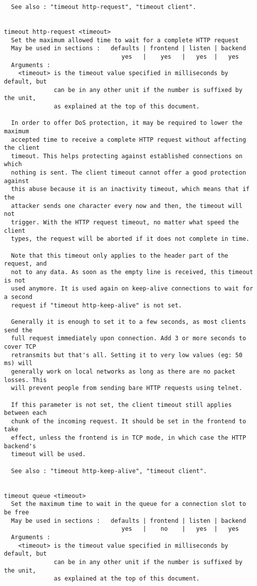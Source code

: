 \begin{verbatim}
  See also : "timeout http-request", "timeout client".


timeout http-request <timeout>
  Set the maximum allowed time to wait for a complete HTTP request
  May be used in sections :   defaults | frontend | listen | backend
                                 yes   |    yes   |   yes  |   yes
  Arguments :
    <timeout> is the timeout value specified in milliseconds by default, but
              can be in any other unit if the number is suffixed by the unit,
              as explained at the top of this document.

  In order to offer DoS protection, it may be required to lower the maximum
  accepted time to receive a complete HTTP request without affecting the client
  timeout. This helps protecting against established connections on which
  nothing is sent. The client timeout cannot offer a good protection against
  this abuse because it is an inactivity timeout, which means that if the
  attacker sends one character every now and then, the timeout will not
  trigger. With the HTTP request timeout, no matter what speed the client
  types, the request will be aborted if it does not complete in time.

  Note that this timeout only applies to the header part of the request, and
  not to any data. As soon as the empty line is received, this timeout is not
  used anymore. It is used again on keep-alive connections to wait for a second
  request if "timeout http-keep-alive" is not set.

  Generally it is enough to set it to a few seconds, as most clients send the
  full request immediately upon connection. Add 3 or more seconds to cover TCP
  retransmits but that's all. Setting it to very low values (eg: 50 ms) will
  generally work on local networks as long as there are no packet losses. This
  will prevent people from sending bare HTTP requests using telnet.

  If this parameter is not set, the client timeout still applies between each
  chunk of the incoming request. It should be set in the frontend to take
  effect, unless the frontend is in TCP mode, in which case the HTTP backend's
  timeout will be used.

  See also : "timeout http-keep-alive", "timeout client".


timeout queue <timeout>
  Set the maximum time to wait in the queue for a connection slot to be free
  May be used in sections :   defaults | frontend | listen | backend
                                 yes   |    no    |   yes  |   yes
  Arguments :
    <timeout> is the timeout value specified in milliseconds by default, but
              can be in any other unit if the number is suffixed by the unit,
              as explained at the top of this document.


\end{verbatim}
